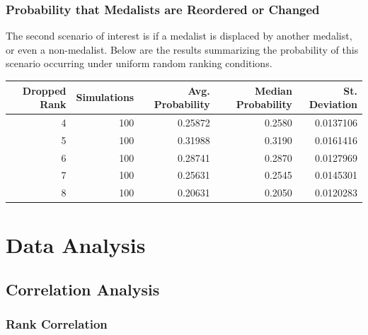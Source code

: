 \documentclass[12pt]{article}
\begin{document}
\hypertarget{probability-that-medalists-are-reordered-or-changed}{%
\subsubsection{Probability that Medalists are Reordered or
Changed}\label{probability-that-medalists-are-reordered-or-changed}}

The second scenario of interest is if a medalist is displaced by another
medalist, or even a non-medalist. Below are the results summarizing the
probability of this scenario occurring under uniform random ranking
conditions.

\begin{tabular}{rrrrr}
\toprule
Dropped Rank & Simulations & Avg. Probability & Median Probability & St. Deviation\\
\midrule
4 & 100 & 0.25872 & 0.2580 & 0.0137106\\
5 & 100 & 0.31988 & 0.3190 & 0.0161416\\
6 & 100 & 0.28741 & 0.2870 & 0.0127969\\
7 & 100 & 0.25631 & 0.2545 & 0.0145301\\
8 & 100 & 0.20631 & 0.2050 & 0.0120283\\
\bottomrule
\end{tabular}

\hypertarget{data-analysis}{%
\section{Data Analysis}\label{data-analysis}}

\hypertarget{correlation-analysis}{%
\subsection{Correlation Analysis}\label{correlation-analysis}}

\hypertarget{rank-correlation}{%
\subsubsection{Rank Correlation}\label{rank-correlation}}
\end{document}
